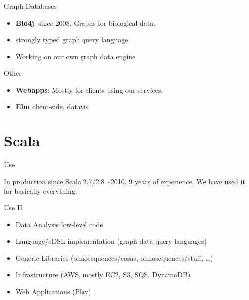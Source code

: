 \documentclass[notheorems,14pt,compress]{beamer}
\providecommand{\tightlist}{%
\setlength{\itemsep}{0pt}\setlength{\parskip}{0pt}}
\theoremstyle{definition}
\begin{document}
\begin{frame}{%
\protect\hypertarget{graph-databases}{%
Graph Databases}}

\begin{itemize}
\tightlist
\item
  \textbf{Bio4j}: since 2008. Graphs for biological data.
\item
  strongly typed graph query language
\item
  Working on our own graph data engine
\end{itemize}

\end{frame}

\begin{frame}{%
\protect\hypertarget{other}{%
Other}}

\begin{itemize}
\tightlist
\item
  \textbf{Webapps}: Mostly for clients using our services.
\item
  \textbf{Elm} client-side, datavis
\end{itemize}

\end{frame}

\hypertarget{scala}{%
\section{Scala}\label{scala}}

\begin{frame}{%
\protect\hypertarget{use}{%
Use}}

In production since Scala 2.7/2.8 \textasciitilde{}2010. 9 years of
experience. We have used it for basically everything:

\end{frame}

\begin{frame}{%
\protect\hypertarget{use-ii}{%
Use II}}

\begin{itemize}
\tightlist
\item
  Data Analysis low-level code
\item
  Language/eDSL implementation (graph data query languages)
\item
  Generic Libraries (ohnosequences/cosas, ohnosequences/stuff, \ldots{})
\item
  Infrastructure (AWS, mostly EC2, S3, SQS, DynamoDB)
\item
  Web Applications (Play)
\end{itemize}

\end{frame}
\end{document}
